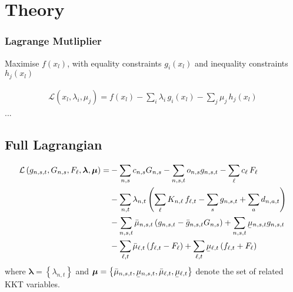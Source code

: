 \documentclass[11pt]{article}
\newcommand{\ubar}[1]{\underaccent{\bar}{#1}}
\newcommand{\generation}{g_{n,s,t}}
\newcommand{\generationpotential}{\bar{g}_{n,s,t}}
\newcommand{\capacityGeneration}{G_{n,s}}
\newcommand{\capacityFlow}{F_{\ell}}
\newcommand{\capexGeneration}{c_{n,s}}
\newcommand{\capexFlow}{c_{\ell}}
\newcommand{\opexGeneration}[1][n]{o_{#1,s}}
\newcommand{\demand}[1][n]{d_{#1,a,t}}
\newcommand{\incidence}[1][n]{K_{#1,\ell}}
\newcommand{\mulowergeneration}[1][n]{\ubar{\mu}_{#1,s,t}}
\newcommand{\muuppergeneration}[1][n]{\bar{\mu}_{#1,s,t}}
\newcommand{\mulowerflow}{\ubar{\mu}_{\ell,t}}
\newcommand{\muupperflow}{\bar{\mu}_{\ell,t}}
\newcommand{\lmp}[1][n]{\lambda_{#1,t}}
\newcommand{\flow}{f_{\ell,t}}
\newcommand{\cycle}{C_{\ell,c}}
\newcommand{\impedance}{x_\ell}
\newcommand{\cycleprice}{\lambda_{c,t}}
\newcommand{\lagrangian}{\mathcal{L}}
\begin{document}
\newpage

\section*{Theory}
\subsubsection*{Lagrange Mutliplier}

Maximise $f(x_l)$, with equality constraints $g_i(x_l)$ and inequality constraints $h_j(x_l)$

\begin{align}
 \mathcal {L}(x_l,\lambda_i, \mu_j)=f(x_l)-\sum_i \lambda_i \, g_i(x_l) - \sum_j \mu_j \, h_j(x_l)
\end{align}
...

\subsection*{Full Lagrangian}
\begin{align}
 \lagrangian\left(\generation, \capacityGeneration, \capacityFlow, \boldsymbol{\lambda}, \boldsymbol{\mu} \right)   = &- \sum_{n,s} \capexGeneration \capacityGeneration - \sum_{n, s, t} \opexGeneration \generation - \sum_{\ell} \capexFlow \, \capacityFlow  \\
 &- \sum_{n,t} \lmp \left(\sum_\ell \incidence \, \flow  - \sum_s \generation + \sum_a \demand  \right)  \\ 
 &- \sum_{n,s,t} \muuppergeneration \left( \generation - \generationpotential \capacityGeneration \right)  + \sum_{n,s,t} \mulowergeneration \generation  \\
 &- \sum_{\ell,t} \muupperflow \left( \flow - \capacityFlow \right) + \sum_{\ell,t} \mulowerflow \left( \flow + \capacityFlow \right)     
\end{align}
% 
where $\boldsymbol{\lambda} = \left\lbrace \lmp \right\rbrace $ and $\boldsymbol{\mu} = \left\lbrace \muuppergeneration, \mulowergeneration, \muupperflow, \mulowerflow \right\rbrace $ denote the set of related KKT variables.
\end{document}
